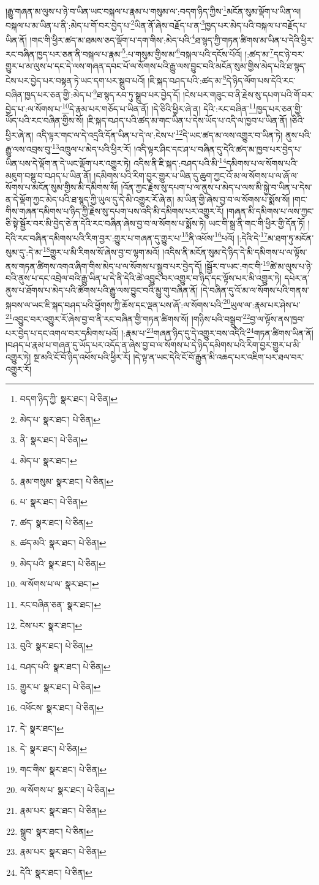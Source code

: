 །རྒྱུ་གཞན་མ་ལུས་པ་ཉེ་བ་ཡིན་ཡང་བསྐལ་པ་རྣམ་པ་གསུམ་ལ་:བདག་ཉིད་ཀྱིས་\footnote{བདག་ཉིད་ཀྱི་  སྣར་ཐང་།  པེ་ཅིན། }མངོན་སུམ་ལྡོག་པ་ཡིན་ལ། བསྐལ་པ་མ་ཡིན་པ་ནི་:མེད་པ་གོ་བར་བྱེད་པ་\footnote{མེད་པ་  སྣར་ཐང་།  པེ་ཅིན། }ཡིན་ནོ་ཞེས་བརྗོད་པ་ན་\footnote{ནི་  སྣར་ཐང་།  པེ་ཅིན། }ཁྱད་པར་མེད་པའི་བསྐལ་པ་བརྗོད་པ་ཡིན་ནོ། །གང་གི་ཕྱིར་ཚད་མ་ཐམས་ཅད་ལྡོག་པ་དག་གིས་:མེད་པའི་\footnote{མེད་པ་  སྣར་ཐང་། }ཐ་སྙད་ཀྱི་གཏན་ཚིགས་མ་ཡིན་པ་དེའི་ཕྱིར་རང་བཞིན་ཁྱད་པར་ཅན་ནི་བསྐལ་པ་རྣམ་\footnote{རྣམ་གསུམ་  སྣར་ཐང་།  པེ་ཅིན། }:པ་གསུམ་གྱིས་མ་\footnote{པ་  སྣར་ཐང་།  པེ་ཅིན། }བསྐལ་པའི་དངོས་པོའོ། །:ཚད་མ་\footnote{ཚད་  སྣར་ཐང་།  པེ་ཅིན། }དང་ཉེ་བར་གྱུར་པ་མ་ལུས་པ་དང་དེ་ལས་གཞན་དབང་པོ་ལ་སོགས་པའི་རྒྱུ་ལས་བྱུང་བའི་མངོན་སུམ་གྱིས་མེད་པའི་ཐ་སྙད་ངེས་པར་བྱེད་པར་བསྟན་ཏེ་ཡང་དག་པར་སྒྲུབ་པའོ། །ཇི་སྐད་བཤད་པའི་:ཚད་མ་\footnote{ཚད་མའི་  སྣར་ཐང་།  པེ་ཅིན། }དེ་ཉིད་ལོག་པས་དེའི་རང་བཞིན་ཁྱད་པར་ཅན་གྱི་:མེད་པ་\footnote{མེད་པའི་  སྣར་ཐང་།  པེ་ཅིན། }ཐ་སྙད་རབ་ཏུ་སྒྲུབ་པར་བྱེད་དོ། །ངེས་པར་གཟུང་བ་ནི་རྗེས་སུ་དཔག་པའི་གོ་བར་བྱེད་པ་:ལ་སོགས་པ་\footnote{ལ་སོགས་པ་ལ་  སྣར་ཐང་། }དེ་རྣམ་པར་གཅོད་པ་ཡིན་ནོ། །དེ་ཅིའི་ཕྱིར་ཞེ་ན། དེའི་:རང་བཞིན་\footnote{རང་བཞིན་ཅན་  སྣར་ཐང་། }ཁྱད་པར་ཅན་གྱི་ཡོད་པའི་རང་བཞིན་གྱིས་སོ། །ཇི་སྐད་བཤད་པའི་ཚད་མ་གང་ཡིན་པ་དེས་ཡོད་པ་འདི་ལ་ཁྱབ་པ་ཡིན་ནོ། །ཅིའི་ཕྱིར་ཞེ་ན། འདི་ལྟར་གང་ལ་དེ་འདྲའི་དོན་ཡིན་པ་དེ་ལ་:ངེས་པ་\footnote{ངེས་པར་  སྣར་ཐང་། }དེ་ཡང་ཚད་མ་ལས་འགྱུར་བ་ཡིན་ཏེ། ནུས་པའི་རྒྱུ་ལས་འབྲས་བུ་\footnote{བུའི་  སྣར་ཐང་།  པེ་ཅིན། }འཁྲུལ་པ་མེད་པའི་ཕྱིར་རོ། །འདི་ལྟར་ཤིང་དང་ཤ་པ་བཞིན་དུ་དེའི་ཚད་མ་ཁྱབ་པར་བྱེད་པ་ཡིན་པས་དེ་ལྡོག་ན་དེ་ཡང་ལྡོག་པར་འགྱུར་ཏེ། འདིས་ནི་ཇི་སྐད་:བཤད་པའི་མི་\footnote{བཤད་པའི་  སྣར་ཐང་།  པེ་ཅིན། }དམིགས་པ་ལ་སོགས་པའི་མཇུག་བསྡུ་བ་བཤད་པ་ཡིན་ནོ། །དམིགས་པའི་རིག་བྱར་གྱུར་པ་ཡིན་དུ་ཆུག་ཀྱང་འོ་མ་ལ་སོགས་པ་ལ་ཞོ་ལ་སོགས་པ་མངོན་སུམ་གྱིས་མི་དམིགས་སོ། །འོན་ཀྱང་རྗེས་སུ་དཔག་པ་ལ་ནུས་པ་མེད་པ་ལས་མི་སྐྱེ་བ་ཡིན་པ་དེས་ན་དེ་ལྡོག་ཀྱང་མེད་པའི་ཐ་སྙད་ཀྱི་ཡུལ་དུ་དེ་མི་འགྱུར་རོ་ཞེ་ན། མ་ཡིན་གྱི་ཞེས་བྱ་བ་ལ་སོགས་པ་སྨོས་སོ། །གང་གིས་གཞན་དམིགས་པ་ཉིད་ཀྱི་རྗེས་སུ་དཔག་པས་འདི་མི་དམིགས་པར་འགྱུར་རོ། །གཞན་མི་དམིགས་པ་ལས་ཀྱང་ཅི་སྟེ་སྦྱོར་བར་མི་བྱེད་ཅེ་ན་དེའི་རང་བཞིན་ཞེས་བྱ་བ་ལ་སོགས་པ་སྨོས་ཏེ། ཡང་གི་སྒྲ་ནི་གང་གི་ཕྱིར་གྱི་དོན་ཏོ། །དེའི་རང་བཞིན་དམིགས་པའི་རིག་བྱར་:གྱུར་པ་གཞན་དུ་གྱུར་པ་\footnote{གྱུར་པ་  སྣར་ཐང་།  པེ་ཅིན། }ནི་འཕོས་\footnote{འཕོངས་  སྣར་ཐང་།  པེ་ཅིན། }པའོ། །:དེའི་དེ་\footnote{དེ་  སྣར་ཐང་། }མ་ཐག་ཏུ་མངོན་སུམ་དུ་:དེ་མ་\footnote{དེ་  སྣར་ཐང་།  པེ་ཅིན། }གྱུར་པ་མི་རིགས་སོ་ཞེས་བྱ་བ་ལྷག་མའོ། །འདིས་ནི་མངོན་སུམ་དེ་ཉིད་དེ་མི་དམིགས་པ་ལ་ལྟོས་ནས་གཏན་ཚིགས་འགའ་ཞིག་གིས་མེད་པ་ལ་སོགས་པ་སྒྲུབ་པར་བྱེད་དོ། །སྦྱོར་བ་ཡང་:གང་གི་\footnote{གང་གིས་  སྣར་ཐང་།  པེ་ཅིན། }ཚེ་མ་ལུས་པ་ཉེ་བའི་ནུས་པ་དང་འབྲེལ་བའི་རྒྱུ་ཡིན་པ་དེ་ནི་དེའི་ཚེ་འབྱུང་བར་འགྱུར་བ་ཉིད་དང་ལྟོས་པར་མི་འགྱུར་ཏེ། དཔེར་ན་ནུས་པ་ཐོགས་པ་མེད་པའི་ཚོགས་པའི་རྒྱུ་ལས་བྱུང་བའི་མྱུ་གུ་བཞིན་ནོ། །དེ་བཞིན་དུ་འོ་མ་ལ་སོགས་པའི་གནས་སྐབས་ལ་ཡང་ཇི་སྐད་བཤད་པའི་ཕྱོགས་ཀྱི་ཆོས་དང་ལྡན་པས་ཞོ་:ལ་སོགས་པའི་\footnote{ལ་སོགས་པ་  སྣར་ཐང་།  པེ་ཅིན། }ཡུལ་ལ་:རྣམ་པར་ཤེས་པ་\footnote{རྣམ་པར་  སྣར་ཐང་།  པེ་ཅིན། }འབྱུང་བར་འགྱུར་རོ་ཞེས་བྱ་བ་ནི་རང་བཞིན་གྱི་གཏན་ཚིགས་སོ། །གཉིས་པའི་བསྒྲུབ་\footnote{སྒྲུབ་  སྣར་ཐང་།  པེ་ཅིན། }བྱ་ལ་ལྟོས་ནས་ཁྱབ་པར་བྱེད་པ་དང་འགལ་བར་དམིགས་པའོ། །:རྣམ་པ་\footnote{རྣམ་པར་  སྣར་ཐང་།  པེ་ཅིན། }གཞན་ཉིད་དུ་དེ་འགྱུར་བས་འདིའི་\footnote{དེའི་  སྣར་ཐང་།  པེ་ཅིན། }གཏན་ཚིགས་ཡིན་ནོ། །བཤད་པ་རྣམ་པ་གཞན་དུ་ཡོད་པར་འདོད་ན་ཞེས་བྱ་བ་ལ་སོགས་པ་དེ་ཉིད་དམིགས་པའི་རིག་བྱར་གྱུར་པ་མི་འགྱུར་ཏེ། སྔ་མའི་ངོ་བོ་ཉིད་འཕོས་པའི་ཕྱིར་རོ། །དེ་ལྟ་ན་ཡང་དེའི་ངོ་བོ་རྒྱུན་མི་འཆད་པར་འཇིག་པར་ཐལ་བར་འགྱུར་རོ། 